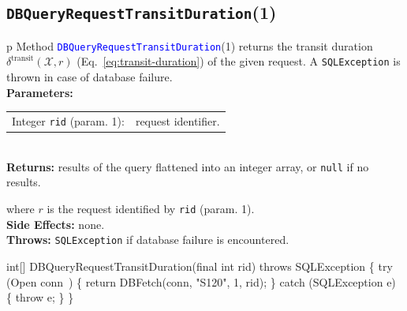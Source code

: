 \subsection{\texttt{DBQueryRequestTransitDuration}(1)}
\begin{tabular}{p{\textwidth}}
\toprule
{}
Method \textcolor{blue}{{\tt{}\protect{}DBQueryRequestTransitDuration}}(1) returns the
transit duration $\delta^\textrm{transit}(\mathcal{X},r)$
(Eq.~\ref{eq:transit-duration}) of the given request.
A {\tt{}SQLException} is thrown in case of database failure.\\
\midrule
\textbf{Parameters:}\\
\begin{tabular}{lp{116mm}}
Integer {\tt{}rid} (param. 1):&request identifier.
\end{tabular}\\
\textbf{Returns:} results of the query flattened into an integer array,
or {\tt{}null} if no results.


where $r$ is the request identified by {\tt{}rid} (param. 1).\\
\textbf{Side Effects:} none.\\
\textbf{Throws:} {\tt{}SQLException} if database failure is encountered.\\
\bottomrule
\end{tabular}
\nwenddocs{}\endmoddef{}
int[] DBQueryRequestTransitDuration(final int rid) throws SQLException \{
  try (\LA{}Open \code{}conn\edoc{}~{\nwtagstyle{}}\RA{}) \{
    return DBFetch(conn, "S120", 1, rid);
  \} catch (SQLException e) \{
    throw e;
  \}
\}
\eatline
{}\nwendcode{}\nwdocspar
